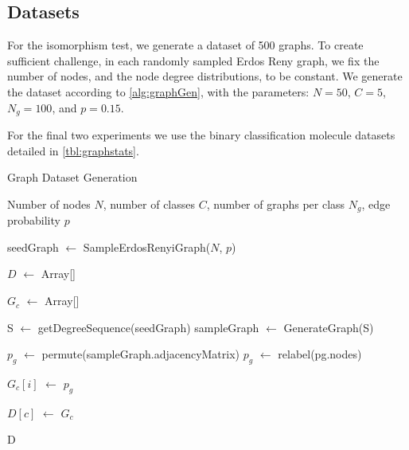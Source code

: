 \documentclass{article}
\theoremstyle{definition}
\begin{document}
\subsection{Datasets}

For the isomorphism test, we generate a dataset of 500 graphs. To create sufficient challenge, in each randomly sampled Erdos Reny \cite{ErdOs1960} graph, we fix the number of nodes, and the node degree distributions, to be constant. We generate the dataset according to \autoref{alg:graphGen}, with the parameters: $N = 50$, $C = 5$, $N_g = 100$, and $p = 0.15$.

For the final two experiments we use the binary classification molecule datasets detailed in \autoref{tbl:graphstats}.

\begin{algorithm}[htb]
  \small
   \caption{Graph Dataset Generation}
   \label{alg:graphGen}
\begin{algorithmic}


 Number of nodes $N$,
number of classes $C$,
number of graphs per class $N_{g}$,
edge probability $p$
    										  
    
\STATE seedGraph $\gets$ SampleErdosRenyiGraph($N$, $p$)
 \ENDWHILE

\STATE $D$ $\gets$ Array[]


	\STATE $G_c$ $\gets$ Array[]
	
	
	\STATE S $\gets$ getDegreeSequence(seedGraph)
	\STATE sampleGraph  $\gets$ GenerateGraph(S)	
	
	
	
		\STATE $p_g$ $\gets$ permute(sampleGraph.adjacencyMatrix)
		\STATE $p_g$ $\gets$ relabel(pg.nodes)
		
		\STATE $G_c[i]$ $\gets$ $p_g$
		
\ENDFOR
	\STATE $D[c]$ $\gets$ $G_c$
\ENDFOR

 D
 

\end{algorithmic}
\end{algorithm}
\end{document}
